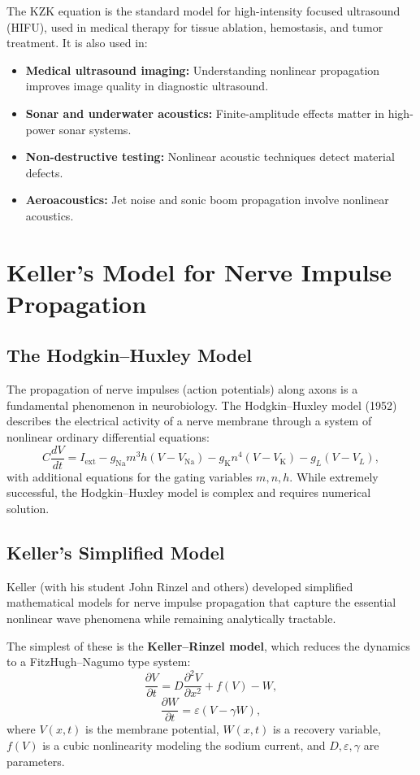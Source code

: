 The KZK equation is the standard model for high-intensity focused ultrasound (HIFU), used in medical therapy for tissue ablation, hemostasis, and tumor treatment. It is also used in:
\begin{itemize}
  \item \textbf{Medical ultrasound imaging:} Understanding nonlinear propagation improves image quality in diagnostic ultrasound.
  \item \textbf{Sonar and underwater acoustics:} Finite-amplitude effects matter in high-power sonar systems.
  \item \textbf{Non-destructive testing:} Nonlinear acoustic techniques detect material defects.
  \item \textbf{Aeroacoustics:} Jet noise and sonic boom propagation involve nonlinear acoustics.
\end{itemize}

\section{Keller's Model for Nerve Impulse Propagation}

\subsection{The Hodgkin--Huxley Model}

The propagation of nerve impulses (action potentials) along axons is a fundamental phenomenon in neurobiology. The Hodgkin--Huxley model (1952) describes the electrical activity of a nerve membrane through a system of nonlinear ordinary differential equations:
\[
C\frac{dV}{dt} = I_{\text{ext}} - g_{\text{Na}} m^3 h (V - V_{\text{Na}}) - g_{\text{K}} n^4 (V - V_{\text{K}}) - g_L (V - V_L),
\]
with additional equations for the gating variables \(m, n, h\). While extremely successful, the Hodgkin--Huxley model is complex and requires numerical solution.

\subsection{Keller's Simplified Model}

Keller (with his student John Rinzel and others) developed simplified mathematical models for nerve impulse propagation that capture the essential nonlinear wave phenomena while remaining analytically tractable.

The simplest of these is the \textbf{Keller--Rinzel model}, which reduces the dynamics to a FitzHugh--Nagumo type system:
\[
\frac{\partial V}{\partial t} = D \frac{\partial^2 V}{\partial x^2} + f(V) - W,
\]
\[
\frac{\partial W}{\partial t} = \varepsilon (V - \gamma W),
\]
where \(V(x, t)\) is the membrane potential, \(W(x, t)\) is a recovery variable, \(f(V)\) is a cubic nonlinearity modeling the sodium current, and \(D, \varepsilon, \gamma\) are parameters.

